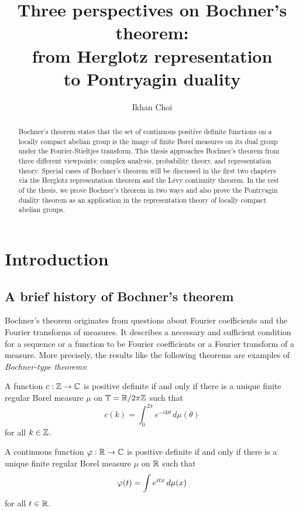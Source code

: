 \documentclass[a4paper]{article}
\title{Three perspectives on Bochner's theorem:\\from Herglotz representation\\to Pontryagin duality}
\author{Ikhan Choi}
\date{}
\begin{document}
\maketitle
\begin{abstract}
Bochner's theorem states that the set of continuous positive definite functions on a locally compact abelian group is the image of finite Borel measures on its dual group under the Fourier-Stieltjes transform.
This thesis approaches Bochner's theorem from three different viewpoints; complex analysis, probability theory, and representation theory.
Special cases of Bochner's theorem will be discussed in the first two chapters via the Herglotz representation theorem and the L\'evy continuity theorem.
In the rest of the thesis, we prove Bochner's theorem in two ways and also prove the Pontryagin duality theorem as an application in the representation theory of locally compact abelian groups.
\end{abstract}
\tableofcontents









\newpage
\section{Introduction}



\subsection{A brief history of Bochner's theorem}

Bochner's theorem originates from questions about Fourier coefficients and the Fourier transforms of measures.
It describes a necessary and sufficient condition for a sequence or a function to be Fourier coefficients or a Fourier transform of a measure.
More precisely, the results like the following theorems are examples of \emph{Bochner-type theorems}:
\begin{thm}
A function $c:\mathbb{Z}\to\mathbb{C}$ is positive definite if and only if there is a unique finite regular Borel measure $\mu$ on $\mathbb{T}=\mathbb{R}/2\pi\mathbb{Z}$ such that
\[c(k)=\int_0^{2\pi}e^{-ik\theta}\,d\mu(\theta)\]
for all $k\in\mathbb{Z}$.
\end{thm}
\begin{thm}
A continuous function $\varphi:\mathbb{R}\to\mathbb{C}$ is positive definite if and only if there is a unique finite regular Borel measure $\mu$ on $\mathbb{R}$ such that
\[\varphi(t)=\int e^{itx}\,d\mu(x)\]
for all $t\in\mathbb{R}$.
\end{thm}
\end{document}
